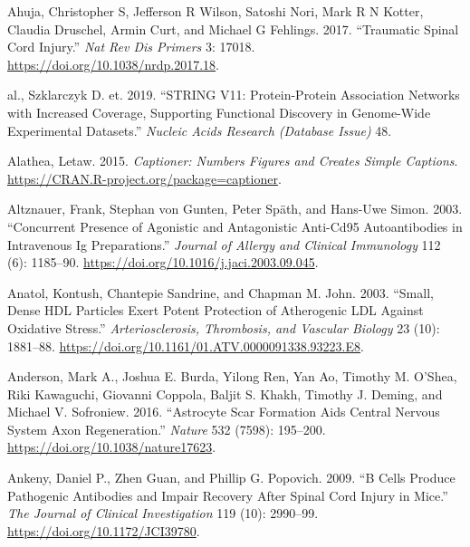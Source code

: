 \documentclass[9pt,lineno]{elife}
\newlength{\cslhangindent}
\newlength{\cslentryspacingunit} %
\newenvironment{CSLReferences}[2] %
 {%
  \setlength{\parindent}{0pt}
  \ifodd #1
  \let\oldpar\par
  \def\par{\hangindent=\cslhangindent\oldpar}
  \fi
  \setlength{\parskip}{#2\cslentryspacingunit}
 }%
 {}
\begin{document}
\hypertarget{refs}{}
\begin{CSLReferences}{1}{0}
\leavevmode{}%
Ahuja, Christopher S, Jefferson R Wilson, Satoshi Nori, Mark R N Kotter, Claudia Druschel, Armin Curt, and Michael G Fehlings. 2017. {``Traumatic Spinal Cord Injury.''} \emph{Nat Rev Dis Primers} 3: 17018. \url{https://doi.org/10.1038/nrdp.2017.18}.

\leavevmode{}%
al., Szklarczyk D. et. 2019. {``STRING V11: Protein-Protein Association Networks with Increased Coverage, Supporting Functional Discovery in Genome-Wide Experimental Datasets.''} \emph{Nucleic Acids Research (Database Issue)} 48.

\leavevmode{}%
Alathea, Letaw. 2015. \emph{Captioner: Numbers Figures and Creates Simple Captions}. \url{https://CRAN.R-project.org/package=captioner}.

\leavevmode{}%
Altznauer, Frank, Stephan von Gunten, Peter Späth, and Hans-Uwe Simon. 2003. {``Concurrent Presence of Agonistic and Antagonistic Anti-{Cd95} Autoantibodies in Intravenous {Ig} Preparations.''} \emph{Journal of Allergy and Clinical Immunology} 112 (6): 1185--90. \url{https://doi.org/10.1016/j.jaci.2003.09.045}.

\leavevmode{}%
Anatol, Kontush, Chantepie Sandrine, and Chapman M. John. 2003. {``Small, {Dense HDL Particles Exert Potent Protection} of {Atherogenic LDL Against Oxidative Stress}.''} \emph{Arteriosclerosis, Thrombosis, and Vascular Biology} 23 (10): 1881--88. \url{https://doi.org/10.1161/01.ATV.0000091338.93223.E8}.

\leavevmode{}%
Anderson, Mark A., Joshua E. Burda, Yilong Ren, Yan Ao, Timothy M. O'Shea, Riki Kawaguchi, Giovanni Coppola, Baljit S. Khakh, Timothy J. Deming, and Michael V. Sofroniew. 2016. {``Astrocyte Scar Formation Aids Central Nervous System Axon Regeneration.''} \emph{Nature} 532 (7598): 195--200. \url{https://doi.org/10.1038/nature17623}.

\leavevmode{}%
Ankeny, Daniel P., Zhen Guan, and Phillip G. Popovich. 2009. {``B Cells Produce Pathogenic Antibodies and Impair Recovery After Spinal Cord Injury in Mice.''} \emph{The Journal of Clinical Investigation} 119 (10): 2990--99. \url{https://doi.org/10.1172/JCI39780}.


\end{CSLReferences}
\end{document}
